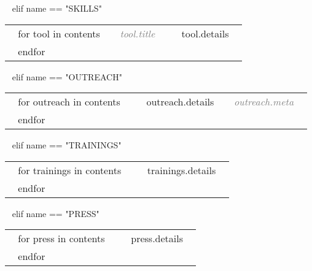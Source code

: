 \begin{minipage}{\textwidth}
%
 
~{ elif name == "SKILLS" }~

\begin{tabular}{ @{} p{} p{135mm} @{} }
  ~{ for tool in contents }~
  \small \textcolor{gray}{{\emph{~{{ tool.title }}~}}} & {\small ~{{ tool.details }}~} \\
  ~{ endfor }~
\end{tabular}

%

~{ elif name == "OUTREACH" }~

\begin{tabular}{ @{} p{} p{} @{} }
  ~{ for outreach in contents }~
  \small \textcolor{gray}{{\emph{ }}} & {\small ~{{ outreach.details }}~ \textcolor{gray}{{\emph{~{{ outreach.meta }}~}}}} \\
  ~{ endfor }~
\end{tabular}


~{ elif name == "TRAININGS" }~

\begin{tabular}{ @{} p{} p{} @{} }
  ~{ for trainings in contents }~
  \small \textcolor{gray}{{\emph{ }}} & {\small ~{{ trainings.details }}~} \\
  ~{ endfor }~
\end{tabular}

~{ elif name == "PRESS" }~

\begin{tabular}{ @{} p{} p{} @{} }
  ~{ for press in contents }~
  \small \textcolor{gray}{{\emph{ }}} & {\small ~{{ press.details }}~} \\
  ~{ endfor }~
\end{tabular}


\end{minipage}
